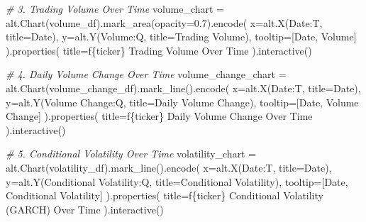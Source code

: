 \documentclass[
  11pt,
]{article}
\newenvironment{Shaded}{}{}
\newcommand{\CommentTok}[1]{\textcolor[rgb]{0.38,0.63,0.69}{\textit{#1}}}
\newcommand{\FloatTok}[1]{\textcolor[rgb]{0.25,0.63,0.44}{#1}}
\newcommand{\NormalTok}[1]{#1}
\newcommand{\OperatorTok}[1]{\textcolor[rgb]{0.40,0.40,0.40}{#1}}
\newcommand{\SpecialCharTok}[1]{\textcolor[rgb]{0.25,0.44,0.63}{#1}}
\newcommand{\SpecialStringTok}[1]{\textcolor[rgb]{0.73,0.40,0.53}{#1}}
\newcommand{\StringTok}[1]{\textcolor[rgb]{0.25,0.44,0.63}{#1}}
\begin{document}
\begin{Shaded}
\begin{Highlighting}[]
\CommentTok{\# 3. Trading Volume Over Time}
\NormalTok{volume\_chart }\OperatorTok{=}\NormalTok{ alt.Chart(volume\_df).mark\_area(opacity}\OperatorTok{=}\FloatTok{0.7}\NormalTok{).encode(}
\NormalTok{    x}\OperatorTok{=}\NormalTok{alt.X(}\StringTok{\textquotesingle{}Date:T\textquotesingle{}}\NormalTok{, title}\OperatorTok{=}\StringTok{\textquotesingle{}Date\textquotesingle{}}\NormalTok{),}
\NormalTok{    y}\OperatorTok{=}\NormalTok{alt.Y(}\StringTok{\textquotesingle{}Volume:Q\textquotesingle{}}\NormalTok{, title}\OperatorTok{=}\StringTok{\textquotesingle{}Trading Volume\textquotesingle{}}\NormalTok{),}
\NormalTok{    tooltip}\OperatorTok{=}\NormalTok{[}\StringTok{\textquotesingle{}Date\textquotesingle{}}\NormalTok{, }\StringTok{\textquotesingle{}Volume\textquotesingle{}}\NormalTok{]}
\NormalTok{).properties(}
\NormalTok{    title}\OperatorTok{=}\SpecialStringTok{f\textquotesingle{}}\SpecialCharTok{\{}\NormalTok{ticker}\SpecialCharTok{\}}\SpecialStringTok{ Trading Volume Over Time\textquotesingle{}}
\NormalTok{).interactive()}

\CommentTok{\# 4. Daily Volume Change Over Time}
\NormalTok{volume\_change\_chart }\OperatorTok{=}\NormalTok{ alt.Chart(volume\_change\_df).mark\_line().encode(}
\NormalTok{    x}\OperatorTok{=}\NormalTok{alt.X(}\StringTok{\textquotesingle{}Date:T\textquotesingle{}}\NormalTok{, title}\OperatorTok{=}\StringTok{\textquotesingle{}Date\textquotesingle{}}\NormalTok{),}
\NormalTok{    y}\OperatorTok{=}\NormalTok{alt.Y(}\StringTok{\textquotesingle{}Volume Change:Q\textquotesingle{}}\NormalTok{, title}\OperatorTok{=}\StringTok{\textquotesingle{}Daily Volume Change\textquotesingle{}}\NormalTok{),}
\NormalTok{    tooltip}\OperatorTok{=}\NormalTok{[}\StringTok{\textquotesingle{}Date\textquotesingle{}}\NormalTok{, }\StringTok{\textquotesingle{}Volume Change\textquotesingle{}}\NormalTok{]}
\NormalTok{).properties(}
\NormalTok{    title}\OperatorTok{=}\SpecialStringTok{f\textquotesingle{}}\SpecialCharTok{\{}\NormalTok{ticker}\SpecialCharTok{\}}\SpecialStringTok{ Daily Volume Change Over Time\textquotesingle{}}
\NormalTok{).interactive()}

\CommentTok{\# 5. Conditional Volatility Over Time}
\NormalTok{volatility\_chart }\OperatorTok{=}\NormalTok{ alt.Chart(volatility\_df).mark\_line().encode(}
\NormalTok{    x}\OperatorTok{=}\NormalTok{alt.X(}\StringTok{\textquotesingle{}Date:T\textquotesingle{}}\NormalTok{, title}\OperatorTok{=}\StringTok{\textquotesingle{}Date\textquotesingle{}}\NormalTok{),}
\NormalTok{    y}\OperatorTok{=}\NormalTok{alt.Y(}\StringTok{\textquotesingle{}Conditional Volatility:Q\textquotesingle{}}\NormalTok{, title}\OperatorTok{=}\StringTok{\textquotesingle{}Conditional Volatility\textquotesingle{}}\NormalTok{),}
\NormalTok{    tooltip}\OperatorTok{=}\NormalTok{[}\StringTok{\textquotesingle{}Date\textquotesingle{}}\NormalTok{, }\StringTok{\textquotesingle{}Conditional Volatility\textquotesingle{}}\NormalTok{]}
\NormalTok{).properties(}
\NormalTok{    title}\OperatorTok{=}\SpecialStringTok{f\textquotesingle{}}\SpecialCharTok{\{}\NormalTok{ticker}\SpecialCharTok{\}}\SpecialStringTok{ Conditional Volatility (GARCH) Over Time\textquotesingle{}}
\NormalTok{).interactive()}


\end{Highlighting}
\end{Shaded}
\end{document}
